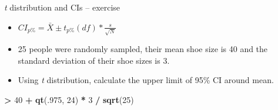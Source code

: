 \documentclass[
  ignorenonframetext,
]{beamer}
\newenvironment{Shaded}{\begin{snugshade}}{\end{snugshade}}
\newcommand{\DecValTok}[1]{\textcolor[rgb]{0.00,0.00,0.81}{#1}}
\newcommand{\FunctionTok}[1]{\textcolor[rgb]{0.13,0.29,0.53}{\textbf{#1}}}
\newcommand{\NormalTok}[1]{#1}
\newcommand{\SpecialCharTok}[1]{\textcolor[rgb]{0.81,0.36,0.00}{\textbf{#1}}}
\begin{document}
\begin{frame}[fragile]{\emph{t} distribution and CIs -- exercise}
\label{t-distribution-and-cis-exercise}
\begin{itemize}
\item
  \(CI_{p\%} = \bar{X} \pm t_{p\%}(df) * \frac{s}{\sqrt{N}}\)
\item
  25 people were randomly sampled, their mean shoe size is 40 and the
  standard deviation of their shoe sizes is 3.
\item
  Using \emph{t} distribution, calculate the upper limit of 95\% CI
  around mean.
\end{itemize}

\begin{Shaded}
\begin{Highlighting}[]
\SpecialCharTok{\textgreater{}} \DecValTok{40} \SpecialCharTok{+} \FunctionTok{qt}\NormalTok{(.}\DecValTok{975}\NormalTok{, }\DecValTok{24}\NormalTok{) }\SpecialCharTok{*} \DecValTok{3} \SpecialCharTok{/} \FunctionTok{sqrt}\NormalTok{(}\DecValTok{25}\NormalTok{)}
\end{Highlighting}
\end{Shaded}
\end{frame}
\end{document}
